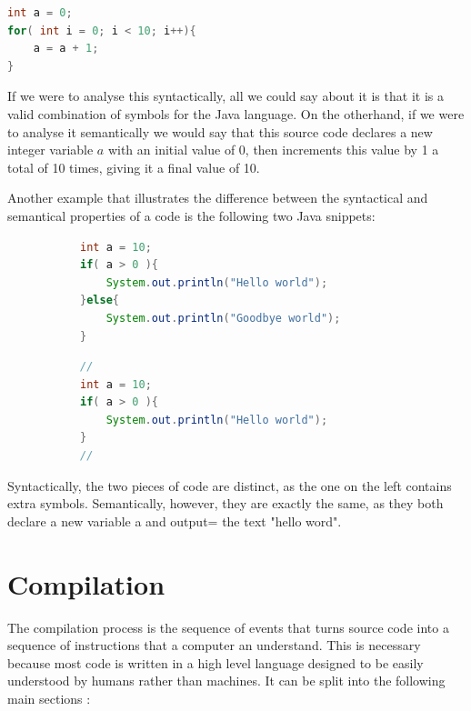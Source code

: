 \documentclass[ %
                    author={Jonathan Rankin},
                supervisor={Dr. David May, Dr. Ian Holyer},
                    degree={MEng},
                     title={CodeTouch},
                  subtitle={A Revolutionary Way To Program Real Code On Touch Screen Devices},
                      type={enterprise},
                      year={2015 } ]{dissertation}
\begin{document}
\begin{lstlisting}[language=Java]
int a = 0;
for( int i = 0; i < 10; i++){
    a = a + 1;
}
\end{lstlisting}

If we were to analyse this syntactically, all we could say about it is that it is a valid combination of symbols for the Java language. On the otherhand, if we were to analyse it semantically we would say that this source code declares a new integer variable $a$ with an initial value of 0, then increments this value by 1 a total of 10 times, giving it a final value of 10. 

Another example that illustrates the difference between the syntactical and semantical properties of a code is the following two Java snippets:

\begin{figure}[h]
\centering
\begin{subfigure}{0.5\textwidth}
  \centering

\begin{lstlisting}[language=Java]
int a = 10;
if( a > 0 ){
    System.out.println("Hello world");
}else{
    System.out.println("Goodbye world");
}
\end{lstlisting}


\end{subfigure}%
\begin{subfigure}{0.5\textwidth}
  \centering
\begin{lstlisting}[language=Java]
//
int a = 10;
if( a > 0 ){
    System.out.println("Hello world");
}
//
\end{lstlisting}


\end{subfigure}
\label{fig:success}
\end{figure}

Syntactically, the two pieces of code are distinct, as the one on the left contains extra symbols. Semantically, however, they are exactly the same, as they both declare a new variable a and output= the text "hello word".




\section{Compilation}
The compilation process is the sequence of events that turns source code into a sequence of instructions that a computer an understand. This is necessary because most code is written in a high level language designed to be easily understood by humans rather than machines. It can be split into the following main sections \cite{compiler}:
\end{document}
